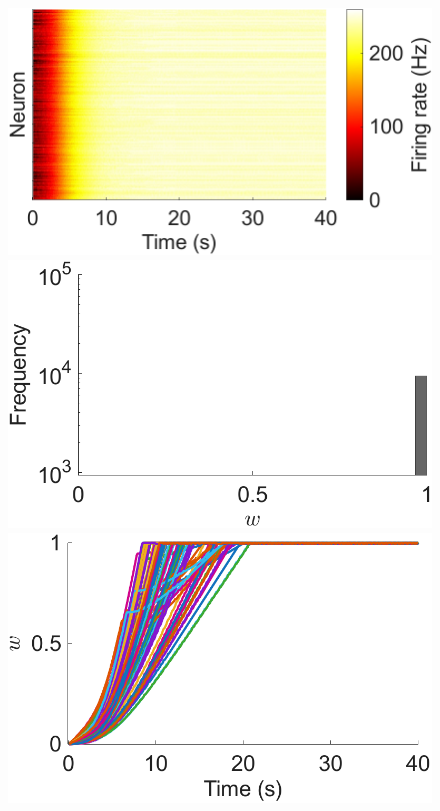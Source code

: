 \documentclass[utf8]{frontiers_suppmat} %
\begin{document}
\begin{subfigure}
\setcounter{figure}{1}
\setcounter{subfigure}{0}
    \centering
    \begin{minipage}[b]{0.32\textwidth}
        \includegraphics[width=\linewidth]{addSTDP/Hz.pdf}
        \caption{}
    \end{minipage}%
\setcounter{figure}{1}
\setcounter{subfigure}{1}
    \begin{minipage}[b]{0.32\textwidth}
        \includegraphics[width=\linewidth]{addSTDP/weights_E2E_histogram.pdf}
        \caption{}
    \end{minipage}%
\setcounter{figure}{1}
\setcounter{subfigure}{2}
    \begin{minipage}[b]{0.32\textwidth}
        \includegraphics[width=\linewidth]{addSTDP/weights_E2E_traces.pdf}

\end{minipage}
\end{subfigure}
\end{document}
